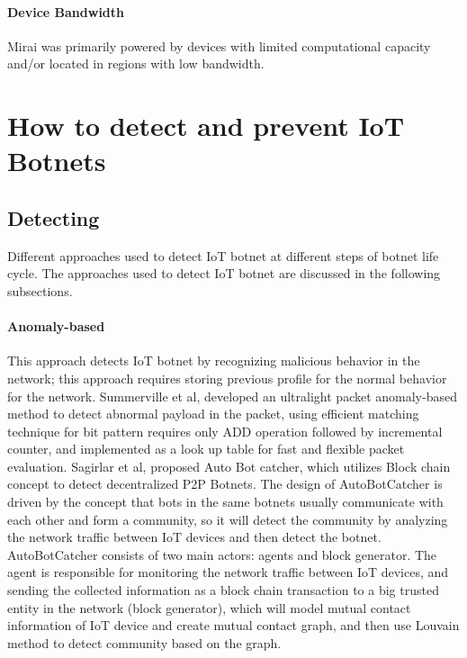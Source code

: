 \documentclass[conference]{IEEEtran}
\begin{document}
\paragraph{\textbf{Device Bandwidth}}
Mirai was primarily powered by devices with limited
computational capacity and/or located in regions with low
bandwidth.

\section{\textbf{How to detect and prevent IoT Botnets}}



\subsection{\textbf{Detecting}}
Different approaches used to detect IoT botnet at different steps of botnet life cycle. The approaches
used to detect IoT botnet are discussed in the following subsections.

\paragraph{\textbf{Anomaly-based}}

This approach detects IoT botnet by recognizing malicious behavior in the network; this approach
requires storing previous profile for the normal behavior for the network. Summerville et al, developed
an ultralight packet anomaly-based method to detect abnormal payload in the packet, using efficient matching
technique for bit pattern requires only ADD operation followed by incremental counter, and implemented as
a look up table for fast and flexible packet evaluation. Sagirlar et al,  proposed Auto Bot catcher, which
utilizes Block chain concept to detect decentralized P2P Botnets. The design of AutoBotCatcher is driven
by the concept that bots in the same botnets usually communicate with each other and form a community,
so it will detect the community by analyzing the network traffic between IoT devices and then detect the
botnet. AutoBotCatcher consists of two main actors: agents and block generator. The agent is responsible
for monitoring the network traffic between IoT devices, and sending the collected information as a block chain
transaction to a big trusted entity in the network (block generator), which will model mutual contact information
of IoT device and create mutual contact graph, and then use Louvain method  to detect community based
on the graph. \cite{b4}
\end{document}
